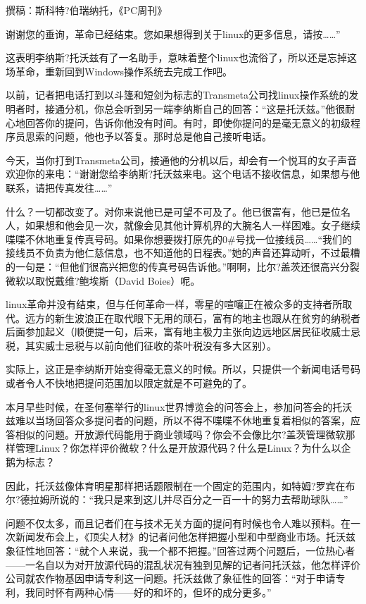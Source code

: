 撰稿：斯科特?伯瑞纳托，《PC周刊》

谢谢您的垂询，革命已经结束。您如果想得到关于linux的更多信息，请按……”

这表明李纳斯?托沃兹有了一名助手，意味着整个linux也流俗了，所以还是忘掉这场革命，重新回到Windows操作系统去完成工作吧。

以前，记者把电话打到以斗篷和短剑为标志的Transmeta公司找linux操作系统的发明者时，接通分机，你总会听到另一端李纳斯自己的回答：“这是托沃兹。”他很耐心地回答你的提问，告诉你他没有时间。有时，即使你提问的是毫无意义的初级程序员思索的问题，他也予以答复。那时总是他自己接听电话。

今天，当你打到Transmeta公司，接通他的分机以后，却会有一个悦耳的女子声音欢迎你的来电：“谢谢您给李纳斯?托沃兹来电。这个电话不接收信息，如果想与他联系，请把传真发往……”

什么？一切都改变了。对你来说他已是可望不可及了。他已很富有，他已是位名人，如果想和他会见一次，就像会见其他计算机界的大腕名人一样困难。女子继续喋喋不休地重复传真号码。如果你想要拨打原先的0\#号找一位接线员……“我们的接线员不负责为他仁慈信息，也不知道他的日程表。”她的声音还算动听，不过最糟的一句是：“但他们很高兴把您的传真号码告诉他。”啊啊，比尔?盖茨还很高兴分裂微软以取悦戴维?鲍埃斯（David Boies）呢。

linux革命并没有结束，但与任何革命一样，零星的喧嚷正在被众多的支持者所取代。远方的新生波浪正在取代眼下无用的顽石，富有的地主也跟从在贫穷的纳税者后面参加起义（顺便提一句，后来，富有地主极力主张向边远地区居民征收威士忌税，其实威士忌税与以前向他们征收的茶叶税没有多大区别）。

实际上，这正是李纳斯开始变得毫无意义的时候。所以，只提供一个新闻电话号码或者令人不快地把提问范围加以限定就是不可避免的了。

本月早些时候，在圣何塞举行的linux世界博览会的问答会上，参加问答会的托沃兹难以当场回答众多提问者的问题，所以不得不喋喋不休地重复着相似的答案，应答相似的问题。开放源代码能用于商业领域吗？你会不会像比尔?盖茨管理微软那样管理Linux？你怎样评价微软？什么是开放源代码？什么是Linux？为什么以企鹅为标志？

因此，托沃兹像体育明星那样把话题限制在一个固定的范围内，如特姆?罗宾在布尔?德拉姆所说的：“我只是来到这儿并尽百分之一百一十的努力去帮助球队……”

问题不仅太多，而且记者们在与技术无关方面的提问有时候也令人难以预料。在一次新闻发布会上，《顶尖人材》的记者问他怎样把握小型和中型商业市场。托沃兹象征性地回答：“就个人来说，我一个都不把握。”回答过两个问题后，一位热心者——一名自以为对开放源代码的混乱状况有独到见解的记者问托沃兹，他怎样评价公司就农作物基因申请专利这一问题。托沃兹做了象征性的回答：“对于申请专利，我同时怀有两种心情——好的和坏的，但坏的成分更多。”

